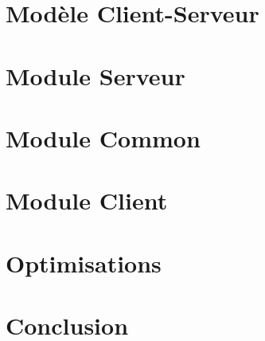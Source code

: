 \documentclass{article}
\begin{document}
\section{Modèle Client-Serveur}


\section{Module Serveur}


\section{Module Common}


\section{Module Client}


\section{Optimisations}


\section{Conclusion}

\end{document}
